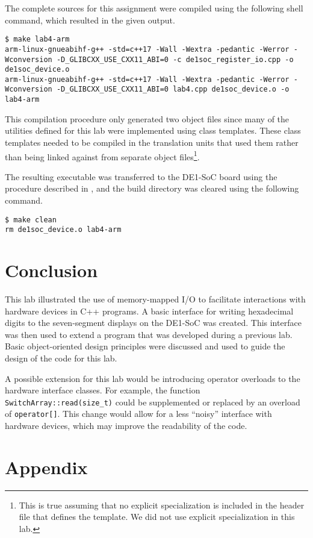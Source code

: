 \documentclass[11pt, letterpaper]{article} %
\begin{document}
The complete sources for this assignment were compiled using the following shell command, which resulted in the given output.
\begin{lstlisting}[style=labreportstyle-sh]
$ make lab4-arm
arm-linux-gnueabihf-g++ -std=c++17 -Wall -Wextra -pedantic -Werror -Wconversion -D_GLIBCXX_USE_CXX11_ABI=0 -c de1soc_register_io.cpp -o de1soc_device.o
arm-linux-gnueabihf-g++ -std=c++17 -Wall -Wextra -pedantic -Werror -Wconversion -D_GLIBCXX_USE_CXX11_ABI=0 lab4.cpp de1soc_device.o -o lab4-arm
\end{lstlisting}
This compilation procedure only generated two object files since many of the utilities defined for this lab were implemented using class templates. These class templates needed to be compiled in the translation units that used them rather than being linked against from separate object files\footnote{This is true assuming that no explicit specialization is included in the header file that defines the template. We did not use explicit specialization in this lab.}.

The resulting executable was transferred to the DE1-SoC board using the procedure described in \cite{report-0}, and the build directory was cleared using the following command.
\begin{lstlisting}[style=labreportstyle-sh]
$ make clean
rm de1soc_device.o lab4-arm
\end{lstlisting}


\section*{Conclusion}

This lab illustrated the use of memory-mapped I/O to facilitate interactions with hardware devices in C++ programs. A basic interface for writing hexadecimal digits to the seven-segment displays on the DE1-SoC was created. This interface was then used to extend a program that was developed during a previous lab. Basic object-oriented design principles were discussed and used to guide the design of the code for this lab. 

A possible extension for this lab would be introducing operator overloads to the hardware interface classes. For example, the function \texttt{SwitchArray::read(size\_t)} could be supplemented or replaced by an overload of \texttt{operator[]}. This change would allow for a less ``noisy'' interface with hardware devices, which may improve the readability of the code.


\clearpage
\section*{Appendix}
\renewcommand{\thelstlisting}{A.\arabic{lstlisting}}
\end{document}
